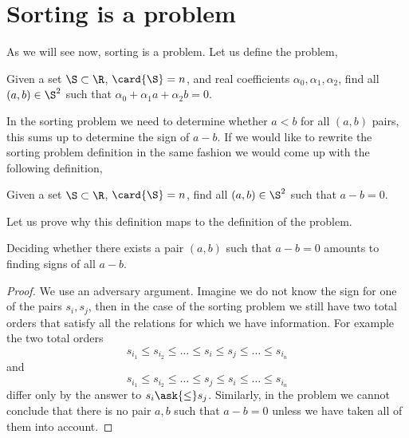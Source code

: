 \section{Sorting is a \twoLDT problem}

As we will see now, sorting is a \twoLDT problem. Let us define the
\twoLDT problem,

\begin{problem}
Given a set $\S \subset \R$, $\card{\S} = n$, and real coefficients $\alpha_0,
\alpha_1, \alpha_2$, find all $(a,b) \in \S^2$ such that
$\alpha_0 + \alpha_1 a + \alpha_2 b = 0$.
\end{problem}

In the sorting problem we need to determine whether $a < b$ for all $(a,b)$
pairs, this sums up to determine the sign of $a-b$. If we would like to rewrite
the sorting problem definition in the same fashion we would come up with the
following definition,

\begin{problem}
Given a set $\S \subset \R$, $\card{\S} = n$, find all $(a,b) \in \S^2$ such that
$a - b = 0$.
\end{problem}

Let us prove why this definition maps to the definition of the \twoLDT
problem.

\begin{theorem}
Deciding whether there exists a pair \((a,b)\) such that \(a - b = 0\)
amounts to finding signs of all \(a-b\).
\end{theorem}

\begin{proof}
We use an adversary argument. Imagine we do not know the sign for one of the
pairs \(s_i,s_j\), then in the case of the sorting problem we still have two
total orders that satisfy all the relations for which we have information. For
example the two total orders
\begin{displaymath}
s_{i_1} \le s_{i_2} \le \ldots \le s_i \le s_j \le \ldots \le s_{i_n}
\end{displaymath}
and
\begin{displaymath}
s_{i_1} \le s_{i_2} \le \ldots \le s_j \le s_i \le \ldots \le s_{i_n}
\end{displaymath}
differ only by the answer to \(s_i \ask{\le} s_j\).
Similarly, in the \twoLDT problem we cannot conclude that there is no pair
\(a,b\) such that \(a-b=0\) unless we have taken all of them into account.
\end{proof}

